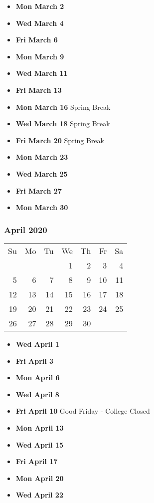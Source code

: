 \documentclass[11pt]{article}
\begin{document}
\begin{itemize}
\item\textbf{Mon March  2}
\item\textbf{Wed March  4}
\item\textbf{Fri March  6}
\item\textbf{Mon March  9}
\item\textbf{Wed March 11}
\item\textbf{Fri March 13}
\item\textbf{Mon March 16} Spring Break
\item\textbf{Wed March 18} Spring Break
\item\textbf{Fri March 20} Spring Break
\item\textbf{Mon March 23}
\item\textbf{Wed March 25}
\item\textbf{Fri March 27}
\item\textbf{Mon March 30}
\end{itemize}
\hrulefill


\subsubsection*{April 2020}
\begin{tabular}{rrrrrrr}
Su & Mo & Tu & We & Th & Fr & Sa\\
   &    &    &  1 &  2 &  3 &  4\\
 5 &  6 &  7 &  8 &  9 & 10 & 11\\
12 & 13 & 14 & 15 & 16 & 17 & 18\\
19 & 20 & 21 & 22 & 23 & 24 & 25\\ 
26 & 27 & 28 & 29 & 30 &    &\\ 
\end{tabular}
\begin{itemize}
\item\textbf{Wed April  1}
\item\textbf{Fri April  3}
\item\textbf{Mon April  6}
\item\textbf{Wed April  8}
\item\textbf{Fri April 10} Good Friday - College Closed
\item\textbf{Mon April 13}
\item\textbf{Wed April 15}
\item\textbf{Fri April 17}
\item\textbf{Mon April 20}
\item\textbf{Wed April 22}
\end{itemize}
\hrulefill
\end{document}
